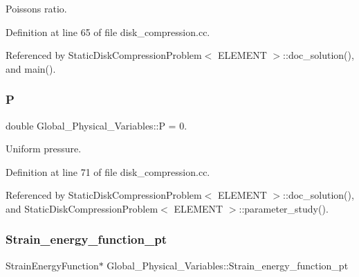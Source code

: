 Poisson\textquotesingle{}s ratio. 



Definition at line 65 of file disk\+\_\+compression.\+cc.



Referenced by Static\+Disk\+Compression\+Problem$<$ E\+L\+E\+M\+E\+N\+T $>$\+::doc\+\_\+solution(), and main().

\mbox{\label{namespaceGlobal__Physical__Variables_a23c2ade6398f54040b869f7f3a2bcc4b}} 
\subsubsection{\texorpdfstring{P}{P}}
{\footnotesize\ttfamily double Global\+\_\+\+Physical\+\_\+\+Variables\+::P = 0.}



Uniform pressure. 



Definition at line 71 of file disk\+\_\+compression.\+cc.



Referenced by Static\+Disk\+Compression\+Problem$<$ E\+L\+E\+M\+E\+N\+T $>$\+::doc\+\_\+solution(), and Static\+Disk\+Compression\+Problem$<$ E\+L\+E\+M\+E\+N\+T $>$\+::parameter\+\_\+study().

\mbox{\label{namespaceGlobal__Physical__Variables_a73135f793690b4386bf83bbefc7bf310}} 
\subsubsection{\texorpdfstring{Strain\+\_\+energy\+\_\+function\+\_\+pt}{Strain\_energy\_function\_pt}}
{\footnotesize\ttfamily Strain\+Energy\+Function$\ast$ Global\+\_\+\+Physical\+\_\+\+Variables\+::\+Strain\+\_\+energy\+\_\+function\+\_\+pt}



